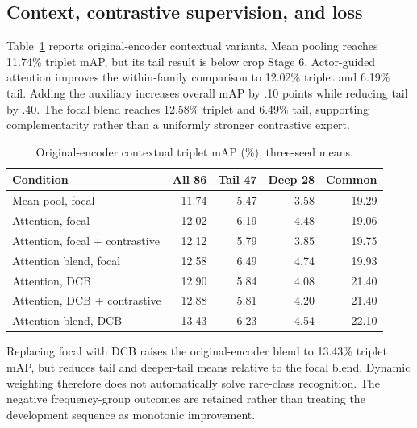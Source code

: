 \documentclass[11pt,letterpaper]{article}
\begin{document}
\subsection{Context, contrastive supervision, and loss}
Table~\ref{tab:context-original} reports original-encoder contextual variants. Mean pooling reaches 11.74\% triplet mAP, but its tail result is below crop Stage 6. Actor-guided attention improves the within-family comparison to 12.02\% triplet and 6.19\% tail. Adding the auxiliary increases overall mAP by .10 points while reducing tail by .40. The focal blend reaches 12.58\% triplet and 6.49\% tail, supporting complementarity rather than a uniformly stronger contrastive expert.
\begin{table}[htbp]
\centering
\caption{Original-encoder contextual triplet mAP (\%), three-seed means.}
\label{tab:context-original}
\begin{singlespace}
\begin{tabularx}{\textwidth}{@{}Xrrrr@{}}
\toprule
\textbf{Condition} & \textbf{All 86} & \textbf{Tail 47} & \textbf{Deep 28} & \textbf{Common} \\
\midrule
Mean pool, focal & 11.74 & 5.47 & 3.58 & 19.29 \\
Attention, focal & 12.02 & 6.19 & 4.48 & 19.06 \\
Attention, focal + contrastive & 12.12 & 5.79 & 3.85 & 19.75 \\
Attention blend, focal & 12.58 & 6.49 & 4.74 & 19.93 \\
Attention, DCB & 12.90 & 5.84 & 4.08 & 21.40 \\
Attention, DCB + contrastive & 12.88 & 5.81 & 4.20 & 21.40 \\
Attention blend, DCB & 13.43 & 6.23 & 4.54 & 22.10 \\
\bottomrule
\end{tabularx}
\end{singlespace}
\end{table}

Replacing focal with DCB raises the original-encoder blend to 13.43\% triplet mAP, but reduces tail and deeper-tail means relative to the focal blend. Dynamic weighting therefore does not automatically solve rare-class recognition. The negative frequency-group outcomes are retained rather than treating the development sequence as monotonic improvement.
\end{document}
